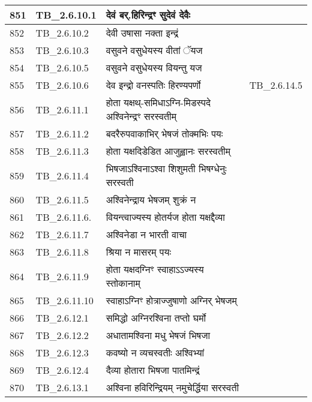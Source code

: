 \documentclass[17pt]{extarticle}
\begin{document}
\begin{longtable}{||p{0.4in}||p{0.9in}||p{4.0in}||p{0.9in}||}
        \hline
            851 & TB\_2.6.10.1 & देवं बर्.हिरिन्द्रꣳ सुदेवं देवैः &      \\
        \hline
            852 & TB\_2.6.10.2 & देवी उषासा नक्ता इन्द्रं &      \\
        \hline
            853 & TB\_2.6.10.3 & वसुवने वसुधेयस्य वीतां ॅयज &      \\
        \hline
            854 & TB\_2.6.10.5 & वसुवने वसुधेयस्य वियन्तु यज &      \\
        \hline
            855 & TB\_2.6.10.6 & देव इन्द्रो वनस्पतिः हिरण्यपर्णो &  TB\_2.6.14.5       \\
        \hline
            856 & TB\_2.6.11.1 & होता यक्षथ्{-}समिधाऽग्नि{-}मिडस्पदे अश्विनेन्द्रꣳ सरस्वतीम् &      \\
        \hline
            857 & TB\_2.6.11.2 & बदरैरुपवाकाभिर् भेषजं तोक्मभिः पयः &      \\
        \hline
            858 & TB\_2.6.11.3 & होता यक्षदिडेडित आजुह्वानः सरस्वतीम् &      \\
        \hline
            859 & TB\_2.6.11.4 & भिषजाऽश्विनाऽश्वा शिशुमती भिषग्धेनुः सरस्वती &      \\
        \hline
            860 & TB\_2.6.11.5 & अश्विनेन्द्राय भेषजम् शुक्रं न &      \\
        \hline
            861 & TB\_2.6.11.6. & वियन्त्वाज्यस्य होतर्यज होता यक्षद्दैव्या &      \\
        \hline
            862 & TB\_2.6.11.7 & अश्विनेडा न भारती वाचा &      \\
        \hline
            863 & TB\_2.6.11.8 & श्रिया न मासरम् पयः &      \\
        \hline
            864 & TB\_2.6.11.9 & होता यक्षदग्निꣳ स्वाहाऽऽज्यस्य स्तोकानाम् &      \\
        \hline
            865 & TB\_2.6.11.10 & स्वाहाऽग्निꣳ होत्राज्जुषाणो अग्निर् भेषजम् &      \\
        \hline
            866 & TB\_2.6.12.1 & समिद्धो अग्निरश्विना तप्तो घर्मो &      \\
        \hline
            867 & TB\_2.6.12.2 & अधातामश्विना मधु भेषजं भिषजा &      \\
        \hline
            868 & TB\_2.6.12.3 & कवष्यो न व्यचस्वतीः अश्विभ्यां &      \\
        \hline
            869 & TB\_2.6.12.4 & दैव्या होतारा भिषजा पातमिन्द्रं &      \\
        \hline
            870 & TB\_2.6.13.1 & अश्विना हविरिन्द्रियम् नमुचेर्द्धिया सरस्वती &      \\

\end{longtable}
\end{document}
